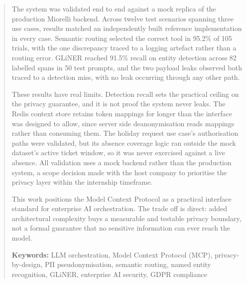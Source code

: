 \begin{abstract}
The system was validated end to end against a mock replica of the production Miorelli backend. Across twelve test scenarios spanning three use cases, results matched an independently built reference implementation in every case. Semantic routing selected the correct tool in 95.2\% of 105 trials, with the one discrepancy traced to a logging artefact rather than a routing error. GLiNER reached 91.5\% recall on entity detection across 82 labelled spans in 50 test prompts, and the two payload leaks observed both traced to a detection miss, with no leak occurring through any other path.

These results have real limits. Detection recall sets the practical ceiling on the privacy guarantee, and it is not proof the system never leaks. The Redis context store retains token mappings for longer than the interface was designed to allow, since server side deanonymisation reads mappings rather than consuming them. The holiday request use case's authorisation paths were validated, but its absence coverage logic ran outside the mock dataset's active ticket window, so it was never exercised against a live absence. All validation uses a mock backend rather than the production system, a scope decision made with the host company to prioritise the privacy layer within the internship timeframe.

This work positions the Model Context Protocol as a practical interface standard for enterprise AI orchestration. The trade off is direct: added architectural complexity buys a measurable and testable privacy boundary, not a formal guarantee that no sensitive information can ever reach the model.

\vspace{1em}
\noindent\textbf{Keywords:} LLM orchestration, Model Context Protocol (MCP), privacy-by-design, PII pseudonymisation, semantic routing, named entity recognition, GLiNER, enterprise AI security, GDPR compliance
\end{abstract}

\tableofcontents

\mainmatter















